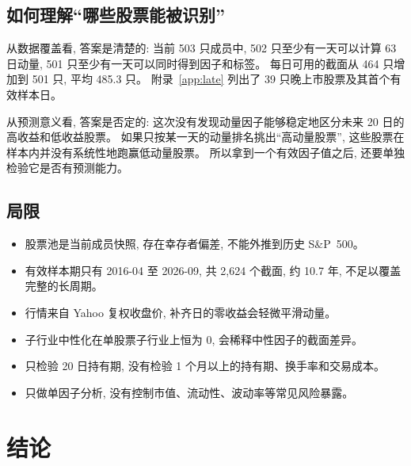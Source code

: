 \documentclass[11pt,a4paper]{article}
\newcommand{\SP}{S\&P~500}
\begin{document}
\subsection{如何理解“哪些股票能被识别”}

从数据覆盖看, 答案是清楚的: 当前 503 只成员中, 502 只至少有一天可以计算 63 日动量, 501 只至少有一天可以同时得到因子和标签。
每日可用的截面从 464 只增加到 501 只, 平均 485.3 只。
附录~\ref{app:late} 列出了 39 只晚上市股票及其首个有效样本日。

从预测意义看, 答案是否定的: 这次没有发现动量因子能够稳定地区分未来 20 日的高收益和低收益股票。
如果只按某一天的动量排名挑出“高动量股票”, 这些股票在样本内并没有系统性地跑赢低动量股票。
所以拿到一个有效因子值之后, 还要单独检验它是否有预测能力。

\subsection{局限}

\begin{itemize}
\item 股票池是当前成员快照, 存在幸存者偏差, 不能外推到历史 \SP。
\item 有效样本期只有 2016-04 至 2026-09, 共 2{,}624 个截面, 约 10.7 年, 不足以覆盖完整的长周期。
\item 行情来自 Yahoo 复权收盘价, 补齐日的零收益会轻微平滑动量。
\item 子行业中性化在单股票子行业上恒为 0, 会稀释中性因子的截面差异。
\item 只检验 20 日持有期, 没有检验 1 个月以上的持有期、换手率和交易成本。
\item 只做单因子分析, 没有控制市值、流动性、波动率等常见风险暴露。
\end{itemize}

\section{结论}
\end{document}

